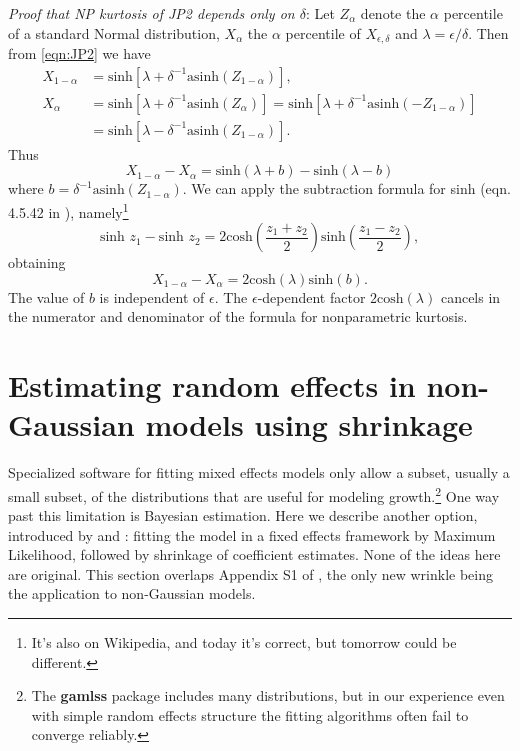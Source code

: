 \documentclass[12pt]{article}
\newcommand{\be}{\begin{equation}}
\newcommand{\ee}{\end{equation}}
\begin{document}
\begin{spacing}{1.35}
\emph{Proof that NP kurtosis of JP2 depends only on $\delta$}: 
Let $Z_\alpha$ denote the $\alpha$ percentile of a standard
Normal distribution, $X_\alpha$ the $\alpha$ percentile of $X_{\epsilon, \delta}$ and 
$\lambda =  \epsilon/\delta$. Then from \eqref{eqn:JP2}
we have 
\be
\begin{aligned}
X_{1-\alpha} & = \mbox{sinh} \left[ \lambda  + \delta^{-1} \mbox{asinh}(Z_{1-\alpha}) \right] ,  \\
X_{\alpha} & = \mbox{sinh} \left[ \lambda  + \delta^{-1} \mbox{asinh}(Z_{\alpha}) \right]
= \mbox{sinh} \left[ \lambda + \delta^{-1} \mbox{asinh}(-Z_{1-\alpha}) \right] \\
& = \mbox{sinh} \left[ \lambda - \delta^{-1} \mbox{asinh}(Z_{1-\alpha}) \right]. 
\end{aligned}
\ee
Thus  
\be
X_{1-\alpha} - X_{\alpha} = \mbox{sinh}(\lambda + b) - \mbox{sinh}(\lambda - b)
\ee
where $b = \delta^{-1}\mbox{asinh}(Z_{1-\alpha})$. We can apply the subtraction formula for sinh (eqn. 4.5.42
in \citet{abram-steg}), namely\footnote{It's also on Wikipedia, and today it's correct, but tomorrow could
be different.}
\be 
\mbox{sinh } z_1 - \mbox{sinh } z_2  = 2 \mbox{cosh}\left( \frac{z_1 + z_2}{2}\right) \mbox{sinh}\left( \frac{z_1 - z_2}{2}\right), 
\ee  
obtaining 
\be
X_{1-\alpha} - X_{\alpha} =  2 \mbox{cosh}(\lambda) \mbox{sinh}(b).
\ee  
The value of $b$ is independent of $\epsilon$. The $\epsilon$-dependent factor $2 \mbox{cosh}(\lambda)$ 
cancels in the numerator and denominator of the formula for nonparametric kurtosis. \scalebox{1.25}{$\square$}

\section{Estimating random effects in non-Gaussian models using shrinkage}
\label{sec:shrinkageFits}
Specialized software for fitting mixed effects models only allow a subset, usually a small subset, of the distributions that 
are useful for modeling growth.\footnote{The \textbf{gamlss} package includes many distributions, but in our experience even with 
simple random effects structure the fitting algorithms often fail to converge reliably.} One way past this limitation is Bayesian estimation. Here we describe another option, 
introduced by \citet{link-nichols-1994} and \citet{gould-nichols-1998}: 
fitting the model in a fixed effects framework by Maximum Likelihood, followed by shrinkage of coefficient estimates. 
None of the ideas here are original. This section overlaps Appendix S1 of \citet{metcalf-etal-2015}, the only new wrinkle
being the application to non-Gaussian models.


\end{spacing}
\end{document}
